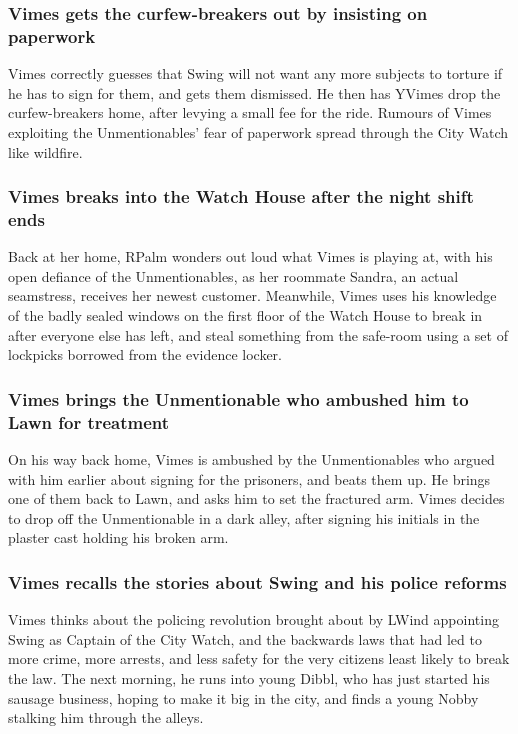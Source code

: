 \subsubsection{\Gls{Vimes} gets the curfew-breakers out by insisting on paperwork}
\Gls{Vimes} correctly guesses that \Gls{Swing} will not want any more subjects to torture if he has
to sign for them, and gets them dismissed. He then has \Gls{YVimes} drop the curfew-breakers home,
after levying a small fee for the ride. Rumours of \Gls{Vimes} exploiting the Unmentionables' fear
of paperwork spread through the City Watch like wildfire.

\subsubsection{\Gls{Vimes} breaks into the Watch House after the night shift ends}
Back at her home, \Gls{RPalm} wonders out loud what \Gls{Vimes} is playing at, with his open
defiance of the Unmentionables, as her roommate \Gls{Sandra}, an actual seamstress, receives her
newest customer. Meanwhile, \Gls{Vimes} uses his knowledge of the badly sealed windows on the
first floor of the Watch House to break in after everyone else has left, and steal something from
the safe-room using a set of lockpicks borrowed from the evidence locker.

\subsubsection{\Gls{Vimes} brings the Unmentionable who ambushed him to \Gls{Lawn} for treatment}
On his way back home, \Gls{Vimes} is ambushed by the Unmentionables who argued with him earlier
about signing for the prisoners, and beats them up. He brings one of them back to \Gls{Lawn}, and
asks him to set the fractured arm. \Gls{Vimes} decides to drop off the Unmentionable in a dark
alley, after signing his initials in the plaster cast holding his broken arm.

\subsubsection{\Gls{Vimes} recalls the stories about \Gls{Swing} and his police reforms}
\Gls{Vimes} thinks about the policing revolution brought about by \Gls{LWind} appointing \Gls{Swing}
as Captain of the City Watch, and the backwards laws that had led to more crime, more arrests, and
less safety for the very citizens least likely to break the law. The next morning, he runs into
young \Gls{Dibbl}, who has just started his sausage business, hoping to make it big in the city,
and finds a young \Gls{Nobby} stalking him through the alleys.

